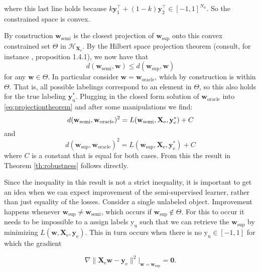 \documentclass{article}
\newcommand{\Xe}{\vec{X}_\mathrm{e}  }
\renewcommand{\vec}[1]{\mathbf{#1}}
\begin{document}
where this last line holds because $k \vec{y}_\text{1}^\top + (1-k) \vec{y}_\text{2}^\top \in [-1,1]^{N_u}$. So the constrained space is convex. 

By construction $\vec{w}_\text{semi}$ is the closest projection of $\vec{w}_\text{sup}$ onto this convex constrained set $\Theta$ in $\mathcal{H}_{\vec{X}_\text{e}}$. By the Hilbert space projection theorem (consult, for instance \cite{Aubin2000}, proposition 1.4.1), we now have that 
\begin{equation}
\label{eq:projectiontheorem}
d(\vec{w}_\text{semi},\vec{w}) \leq d(\vec{w}_\text{sup},\vec{w})
\end{equation}
for any $\vec{w} \in \Theta$. In particular consider $\vec{w}=\vec{w}_\text{oracle}$, which by construction is within $\Theta$. That is, all possible labelings correspond to an element in $\Theta$, so this also holds for the true labeling $\vec{y}_\text{u}^\ast$. Plugging in the closed form solution of $\vec{w}_\text{oracle}$ into \eqref{eq:projectiontheorem} and after some manipulations we find:
\begin{equation}
d(\vec{w}_\text{semi},\vec{w}_\text{oracle})^2=L(\vec{w}_\text{semi},\Xe,\vec{y}_\text{e}^{\ast})+C \\ \nonumber
\end{equation}
and
\begin{equation}
d(\vec{w}_\text{sup},\vec{w}_\text{oracle})^2=L(\vec{w}_\text{sup},\Xe,\vec{y}_\text{e}^{\ast})+C \nonumber
\end{equation} 
where $C$ is a constant that is equal for both cases. From this the result in Theorem \ref{th:robustness} follows directly.

Since the inequality in this result is not a strict inequality, it is important to get an idea when we can expect improvement of the semi-supervised learner, rather than just equality of the losses. Consider a single unlabeled object. Improvement happens whenever $\vec{w}_\text{sup} \neq \vec{w}_\text{semi}$, which occurs if $\vec{w}_\text{sup} \notin \Theta$.  For this to occur it needs to be impossible to a assign labels $\text{y}_\text{u}$ such that we can retrieve the $\vec{w}_\text{sup}$ by minimizing $L(\vec{w},\vec{X}_\text{e},\vec{y}_\text{e})$. This in turn occurs when there is no $\text{y}_\text{u} \in [-1,1]$ for which the gradient

\begin{equation}
\nabla \lVert \vec{X}_\text{e} \vec{w} - \vec{y}_\text{e} \rVert^2\bigg|_{\vec{w}=\vec{w}_\text{sup}}=\vec{0}.
\end{equation}
\end{document}

